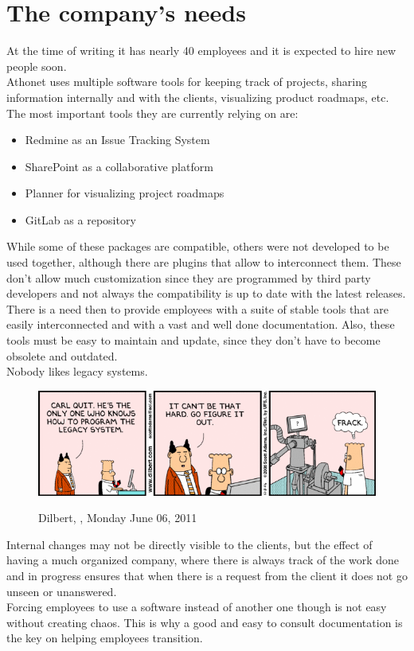 \section{The company's needs}
	At the time of writing it has nearly 40 employees and it is expected to hire new people soon.\\
	Athonet uses multiple software tools for keeping track of projects, sharing information internally and with the clients, visualizing product roadmaps, etc.\\
	The most important tools they are currently relying on are:
	\begin{itemize}
		\item Redmine\cite{redmine} as an Issue Tracking System
		\item SharePoint\cite{sharepoint} as a collaborative platform
		\item Planner\cite{planner} for visualizing project roadmaps
		\item GitLab\cite{gitlab} as a repository
	\end{itemize}
	While some of these packages are compatible, others were not developed to be used together, although there are plugins that allow to interconnect them.
	These don't allow much customization since they are programmed by third party developers and not always the compatibility is up to date with the latest releases.\\	
	There is a need then to provide employees with a suite of stable tools that are easily interconnected and with a vast and well done documentation.
	Also, these tools must be easy to maintain and update, since they don't have to become obsolete and outdated.\\
	Nobody likes legacy systems.
	\begin{figure}[H]
		\centering
		\includegraphics[width=1\textwidth]{resources/legacy-code}\\
		\caption[Dilbert, ]{Dilbert, , Monday June 06, 2011}
	\end{figure}
	Internal changes may not be directly visible to the clients, but the effect of having a much organized company, where there is always track of the work done and in progress ensures that when there is a request from the client it does not go unseen or unanswered.\\
	Forcing employees to use a software instead of another one though is not easy without creating chaos.
	This is why a good and easy to consult documentation is the key on helping employees transition.

